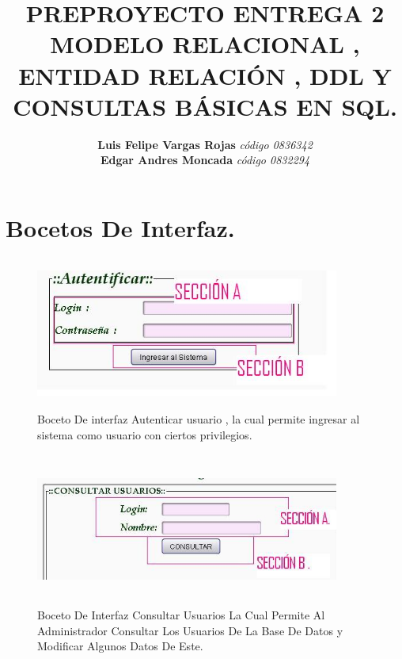\documentclass[]{article}
\title{PREPROYECTO ENTREGA 2 MODELO RELACIONAL , ENTIDAD RELACIÓN , DDL  Y CONSULTAS BÁSICAS EN SQL. }
\author{\textbf{Luis Felipe Vargas Rojas}  \emph{código 0836342} \\
         \textbf {Edgar Andres Moncada} \emph{ código 0832294} }
\begin{document}
\newpage
\maketitle
\section{Bocetos De Interfaz.}

\begin{figure}[h]
\includegraphics[width= 10cm , height= 5cm]{Bocetos/AUTENTICAR.jpg}
\caption{Boceto De interfaz Autenticar usuario , la cual permite ingresar al sistema como usuario con ciertos privilegios.}
\end{figure}

\begin{figure}[h]
\includegraphics[width= 10cm , height= 5cm,angle=0]{Bocetos/consultarUsuarios.jpg}
\caption{Boceto De Interfaz  Consultar Usuarios La Cual Permite Al Administrador Consultar Los Usuarios De La Base De Datos y Modificar Algunos Datos De Este. }
\end{figure}
\end{document}
